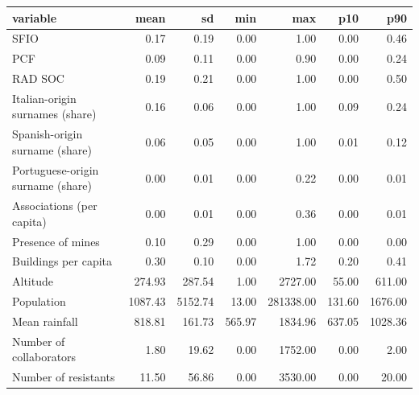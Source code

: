 \begin{table}[ht]
\centering
\begin{tabular}{lrrrrrr}
  \hline
variable & mean & sd & min & max & p10 & p90 \\ 
  \hline
SFIO & 0.17 & 0.19 & 0.00 & 1.00 & 0.00 & 0.46 \\ 
  PCF & 0.09 & 0.11 & 0.00 & 0.90 & 0.00 & 0.24 \\ 
  RAD SOC & 0.19 & 0.21 & 0.00 & 1.00 & 0.00 & 0.50 \\ 
  Italian-origin surnames (share) & 0.16 & 0.06 & 0.00 & 1.00 & 0.09 & 0.24 \\ 
  Spanish-origin surname (share) & 0.06 & 0.05 & 0.00 & 1.00 & 0.01 & 0.12 \\ 
  Portuguese-origin surname (share) & 0.00 & 0.01 & 0.00 & 0.22 & 0.00 & 0.01 \\ 
  Associations (per capita) & 0.00 & 0.01 & 0.00 & 0.36 & 0.00 & 0.01 \\ 
  Presence of mines & 0.10 & 0.29 & 0.00 & 1.00 & 0.00 & 0.00 \\ 
  Buildings per capita & 0.30 & 0.10 & 0.00 & 1.72 & 0.20 & 0.41 \\ 
  Altitude & 274.93 & 287.54 & 1.00 & 2727.00 & 55.00 & 611.00 \\ 
  Population & 1087.43 & 5152.74 & 13.00 & 281338.00 & 131.60 & 1676.00 \\ 
  Mean rainfall & 818.81 & 161.73 & 565.97 & 1834.96 & 637.05 & 1028.36 \\ 
  Number of collaborators & 1.80 & 19.62 & 0.00 & 1752.00 & 0.00 & 2.00 \\ 
  Number of resistants & 11.50 & 56.86 & 0.00 & 3530.00 & 0.00 & 20.00 \\ 
   \hline
\end{tabular}
\end{table}
